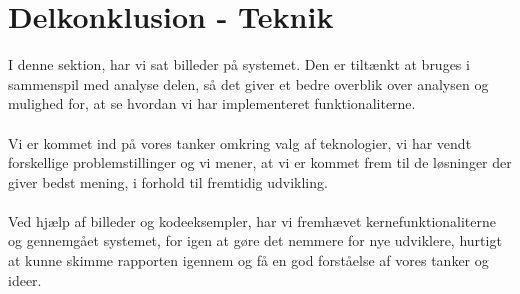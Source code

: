 \section{Delkonklusion - Teknik}
I denne sektion, har vi sat billeder på systemet. Den er tiltænkt at bruges i sammenspil med analyse delen, så det giver et bedre overblik over analysen og mulighed for, at se
hvordan vi har implementeret funktionaliterne.
\\\\
Vi er kommet ind på vores tanker omkring valg af teknologier, vi har vendt forskellige problemstillinger og vi mener, at vi er kommet frem til de løsninger der giver bedst mening, i forhold til fremtidig udvikling.
\\\\
Ved hjælp af billeder og kodeeksempler, har vi fremhævet kernefunktionaliterne og gennemgået systemet, for igen at gøre det nemmere for nye udviklere, hurtigt at kunne skimme rapporten igennem og få en god forståelse af vores tanker og ideer.
